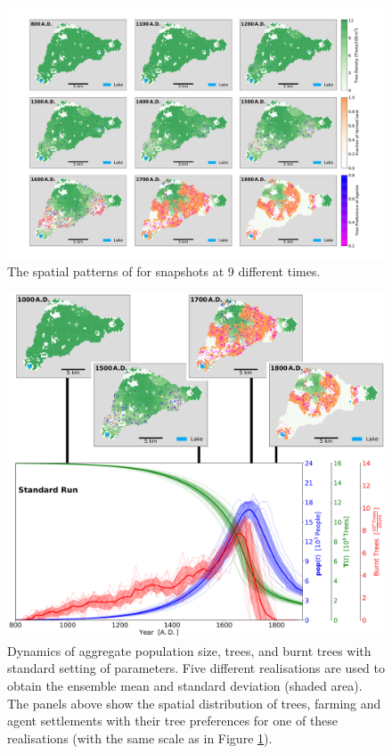 \begin{figure}
	\centering
	\includegraphics[width=1.3\textwidth, center]{images/Results/Standard/Rull2020_Comparison_seed3}
	\caption{The spatial patterns of for snapshots at 9 different times.}
	\label{fig:STDrull}
\end{figure}


\begin{figure}
	\centering
	\includegraphics[width=1.\linewidth, center]{images/Results/Standard/EnsembleStatistics+Panels}
	\caption{Dynamics of aggregate population size, trees, and burnt trees with standard setting of parameters. Five different realisations are used to obtain the ensemble mean and standard deviation (shaded area). The panels above show the spatial distribution of trees, farming and agent settlements with their tree preferences for one of these realisations (with the same scale as in Figure \ref{fig:STDrull}).}
	\label{fig:STDstats}
\end{figure}


